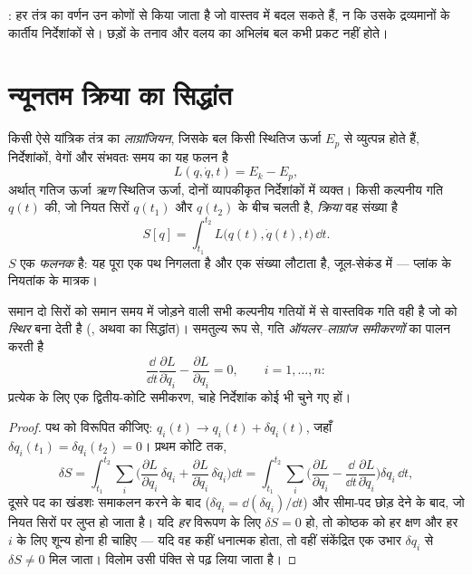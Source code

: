 \begin{omfigure}
{\small {}: हर तंत्र का वर्णन उन कोणों से किया जाता
है जो वास्तव में बदल सकते हैं, न कि उसके द्रव्यमानों के कार्तीय
निर्देशांकों से। छड़ों के तनाव और वलय का अभिलंब बल कभी प्रकट नहीं होते।}
\end{omfigure}

\section{न्यूनतम क्रिया का सिद्धांत}

\begin{definition}[लाग्रांजियन और क्रिया]\label{def:b3:lagrangian-mechanics:action}
किसी ऐसे यांत्रिक तंत्र का \emph{लाग्रांजियन}, जिसके बल किसी स्थितिज
ऊर्जा $E_p$ से व्युत्पन्न होते हैं, निर्देशांकों, वेगों और संभवतः समय
का यह फलन है
\[
L(q, \dot q, t) = E_k - E_p ,
\]
अर्थात् गतिज ऊर्जा \emph{ऋण} स्थितिज ऊर्जा, दोनों व्यापकीकृत
निर्देशांकों में व्यक्त। किसी कल्पनीय गति $q(t)$ की, जो नियत सिरों
$q(t_1)$ और $q(t_2)$ के बीच चलती है, \emph{क्रिया} वह संख्या है
\[
S[q] = \int_{t_1}^{t_2} L\big(q(t), \dot q(t), t\big)\,\dd t .
\]
$S$ एक \emph{फलनक} है: यह पूरा एक पथ निगलता है और एक संख्या लौटाता है,
जूल-सेकंड में --- प्लांक के नियतांक के मात्रक।
\end{definition}

\begin{theorem}\label{thm:b3:lagrangian-mechanics:euler-lagrange}
समान दो सिरों को समान समय में जोड़ने वाली सभी कल्पनीय गतियों में से
वास्तविक गति वही है जो  को
\emph{स्थिर} बना देती है (\emph{}, अथवा
\emph{} का सिद्धांत)। समतुल्य रूप से, गति
\emph{ऑयलर--लाग्रांज समीकरणों} का पालन करती है
\[
\frac{\dd}{\dd t}\frac{\partial L}{\partial\dot q_i}
 - \frac{\partial L}{\partial q_i} = 0 ,
\qquad i = 1, \dots, n :
\]
प्रत्येक  के लिए एक द्वितीय-कोटि समीकरण, चाहे निर्देशांक
कोई भी चुने गए हों।
\end{theorem}

\begin{proof}
पथ को विरूपित कीजिए: $q_i(t) \to q_i(t) + \delta q_i(t)$, जहाँ
$\delta q_i(t_1) = \delta q_i(t_2) = 0$। प्रथम कोटि तक,
\[
\delta S = \int_{t_1}^{t_2}\sum_i\Big(
  \frac{\partial L}{\partial q_i}\,\delta q_i
 + \frac{\partial L}{\partial\dot q_i}\,\delta\dot q_i\Big)\dd t
 = \int_{t_1}^{t_2}\sum_i\Big(
  \frac{\partial L}{\partial q_i}
 - \frac{\dd}{\dd t}\frac{\partial L}{\partial\dot q_i}\Big)\delta q_i\,\dd t ,
\]
दूसरे पद का खंडशः समाकलन करने के बाद ($\delta\dot q_i =
\dd(\delta q_i)/\dd t$) और सीमा-पद छोड़ देने के बाद, जो नियत सिरों पर
लुप्त हो जाता है। यदि \emph{हर} विरूपण के लिए $\delta S = 0$ हो, तो
कोष्ठक को हर क्षण और हर $i$ के लिए शून्य होना ही चाहिए --- यदि वह कहीं
धनात्मक होता, तो वहीं संकेंद्रित एक उभार $\delta q_i$ से
$\delta S \neq 0$ मिल जाता। विलोम उसी पंक्ति से पढ़ लिया जाता है।
\end{proof}

